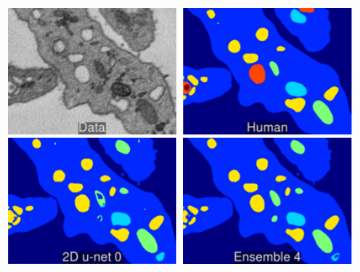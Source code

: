 \documentclass[final]{beamer}
\newlength{\onecolwid}
\newlength{\twocolwid}
\renewcommand{\emph}[1]{{\color{nibib2} #1}}
\begin{document}
\begin{frame}[t]
\begin{columns}[t]
\begin{column}{\twocolwid}
\begin{center}
\begin{figure}
\begin{subfigure}{\onecolwid}
                \includegraphics[width=\linewidth]{fig/top4.png}
            \end{subfigure}
        \end{figure}
    \end{center}
    
    
    

\end{column}
\end{columns}
\end{frame}
\end{document}
